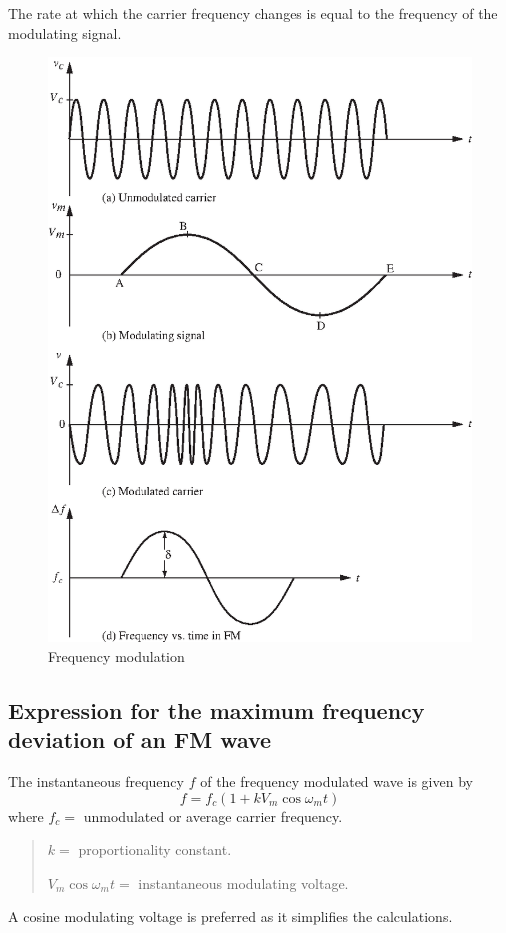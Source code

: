 The rate at which the carrier frequency changes is equal to the frequency of the modulating signal.
\begin{figure}[H]
\centering
\includegraphics[scale=.95]{chap9/S3-EE-07-007.eps}
\caption{Frequency modulation}\label{fig9.8}
\end{figure}

\subsection{Expression for the maximum frequency deviation of an FM wave}\label{sec9.18.3}

The instantaneous frequency $f$ of the frequency modulated wave is given by
\begin{equation}
f=f_{c}(1+kV_{m}\cos \omega_{m}t)\label{eq9.53}
\end{equation}
where $f_{c}=$ unmodulated or average carrier frequency.
\begin{quote}
$k=$ proportionality constant.

$V_{m}\cos \omega_{m}t=$ instantaneous modulating voltage.
\end{quote}
A cosine modulating voltage is preferred as it simplifies the calculations.

